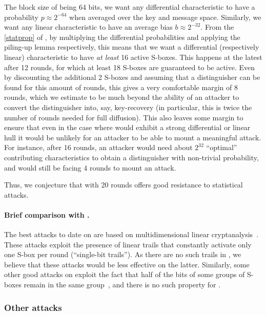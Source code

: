 The block size of \fly being 64 bits, we want any differential characteristic to have a probability $p \approx 2^{-64}$ when averaged over the key and
message space. Similarly, we want any linear characteristic to have an average bias $b \approx 2^{-32}$. From
the \autoref{statprop} of \littlunOne, by multiplying the differential probabilities and applying the piling-up lemma respectively, this means that we want a differential
(respectively linear) characteristic to have \emph{at least} 16 active S-boxes. This happens at the latest after 12 rounds, for which at least 18 S-boxes are guaranteed to be active.
Even by discounting the additional 2 S-boxes and assuming that a distinguisher can be found for this amount of rounds, this gives a very comfortable margin of 8 rounds,
which we estimate to be much beyond the ability of an attacker to convert the distinguisher into, say, key-recovery (in particular, this is twice the number of rounds needed
for full diffusion).
This also leaves some margin to ensure that even in the case where \fly would exhibit a strong differential or linear hull it would be unlikely for an attacker to be able
to mount a meaningful attack. For instance, after 16 rounds, an attacker would need about $2^{32}$ ``optimal'' contributing characteristics to obtain a distinguisher with non-trivial
probability, and would still be facing 4 rounds to mount an attack.

Thus, we conjecture that \fly with 20 rounds offers good resistance to statistical attacks.

\paragraph{Brief comparison with \present.}
The best attacks to date on \present are based on multidimensional linear cryptanalysis~\cite{DBLP:conf/ctrsa/Cho10,DBLP:journals/iacr/BogdanovTV16}. These attacks exploit the presence of linear trails
that constantly activate only one S-box per round (\ie ``single-bit trails''). As there are no such trails in \fly, we believe that these attacks would be less effective
on the latter. Similarly, some other good attacks on \present exploit the fact that half of the bits of some groups of S-boxes remain in the same group~\cite{DBLP:conf/ctrsa/CollardS09},
and there is no such property for \fly.

\subsubsection{Other attacks}

